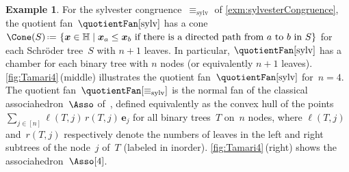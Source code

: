 \documentclass{amsart}
\theoremstyle{definition}
\newtheorem{example}[theorem]{Example}
\renewcommand{\b}[1]{{\boldsymbol{#1}}} %
\newcommand{\set}[2]{\left\{ #1 \;\middle|\; #2 \right\}} %
\newcommand{\eqdef}{\mbox{\,\raisebox{0.2ex}{\scriptsize\ensuremath{\mathrm:}}\ensuremath{=}\,}} %
\newcommand{\hyp}{\mathbb{H}} %
\begin{document}
\begin{example}
\label{exm:sylvesterFanAssociahedron}
For the sylvester congruence~$\equiv_\textrm{sylv}$ of \cref{exm:sylvesterCongruence}, the quotient fan~$\quotientFan[\textrm{sylv}]$ has a cone~$\Cone(S) \eqdef \set{\b{x} \in \hyp}{\b{x}_a \le \b{x}_b \text{ if there is a directed path from } a \text{ to } b \text{ in } S}$ for each Schröder tree~$S$ with $n+1$ leaves.
In particular, $\quotientFan[\textrm{sylv}]$ has a chamber for each binary tree with $n$ nodes (or equivalently $n+1$ leaves).
\cref{fig:Tamari4}\,(middle) illustrates the quotient fan~$\quotientFan[\textrm{sylv}]$ for~$n = 4$.
The quotient fan~$\quotientFan[\equiv_\textrm{sylv}]$ is the normal fan of the classical associahedron~$\Asso$ of~\cite{ShniderSternberg, Loday}, defined equivalently as the convex hull of the points~$\sum_{j \in [n]} \ell(T,j) \, r(T,j) \, \b{e}_j$ for all binary trees~$T$ on~$n$ nodes, where $\ell(T,j)$ and~$r(T,j)$ respectively denote the numbers of leaves in the left and right subtrees of the node~$j$ of~$T$ (labeled in inorder).
\cref{fig:Tamari4}\,(right) shows the associahedron~$\Asso[4]$.
%
\begin{figure}
	\capstart

\end{figure}
\end{example}
\end{document}

